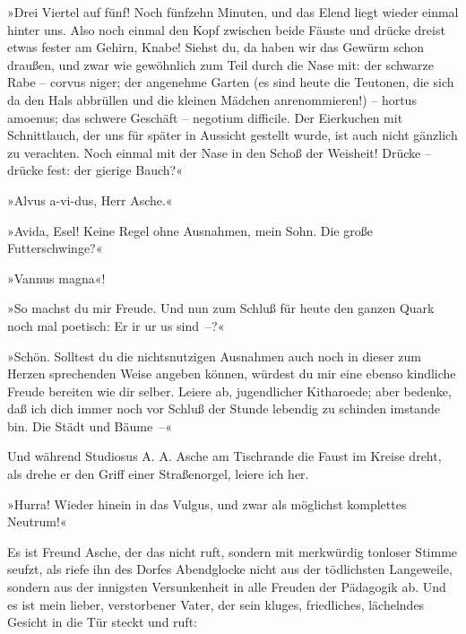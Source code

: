 »Drei Viertel auf fünf! Noch fünfzehn Minuten, und das Elend liegt
wieder einmal hinter uns. Also noch einmal den Kopf zwischen beide
Fäuste und drücke dreist etwas fester am Gehirn, Knabe! Siehst du,
da haben wir das Gewürm schon draußen, und zwar wie gewöhnlich zum
Teil durch die Nase mit: der schwarze Rabe – corvus niger; der
angenehme Garten (es sind heute die Teutonen, die sich da den Hals
abbrüllen und die kleinen Mädchen anrenommieren!) – hortus amoenus;
das schwere Geschäft – negotium difficile. Der Eierkuchen mit
Schnittlauch, der uns für später in Aussicht gestellt wurde, ist
auch nicht gänzlich zu verachten. Noch einmal mit der Nase in den
Schoß der Weisheit! Drücke – drücke fest: der gierige Bauch?«

»Alvus a-vi-dus, Herr Asche.«

»Avida, Esel! Keine Regel ohne Ausnahmen, mein Sohn. Die große
Futterschwinge?«

»Vannus magna«!

»So machst du mir Freude. Und nun zum Schluß für heute den ganzen
Quark noch mal poetisch: Er ir ur us sind~–?«

»Schön. Solltest du die nichtsnutzigen Ausnahmen auch noch in
dieser zum Herzen sprechenden Weise angeben können, würdest du mir
eine ebenso kindliche Freude bereiten wie dir selber. Leiere ab,
jugendlicher Kitharoede; aber bedenke, daß ich dich immer noch vor
Schluß der Stunde lebendig zu schinden imstande bin. Die Städt und
Bäume~–«

Und während Studiosus A. A. Asche am Tischrande die Faust im Kreise
dreht, als drehe er den Griff einer Straßenorgel, leiere ich her.

»Hurra! Wieder hinein in das Vulgus, und zwar als möglichst
komplettes Neutrum!«

Es ist Freund Asche, der das nicht ruft, sondern mit merkwürdig
tonloser Stimme seufzt, als riefe ihn des Dorfes Abendglocke nicht
aus der tödlichsten Langeweile, sondern aus der innigsten
Versunkenheit in alle Freuden der Pädagogik ab. Und es ist mein
lieber, verstorbener Vater, der sein kluges, friedliches,
lächelndes Gesicht in die Tür steckt und ruft:

